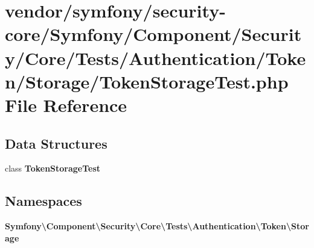 \section{vendor/symfony/security-\/core/\+Symfony/\+Component/\+Security/\+Core/\+Tests/\+Authentication/\+Token/\+Storage/\+Token\+Storage\+Test.php File Reference}
\label{_token_storage_test_8php}
\subsection*{Data Structures}
\begin{DoxyCompactItemize}
\item 
class {\bf Token\+Storage\+Test}
\end{DoxyCompactItemize}
\subsection*{Namespaces}
\begin{DoxyCompactItemize}
\item 
 {\bf Symfony\textbackslash{}\+Component\textbackslash{}\+Security\textbackslash{}\+Core\textbackslash{}\+Tests\textbackslash{}\+Authentication\textbackslash{}\+Token\textbackslash{}\+Storage}
\end{DoxyCompactItemize}
